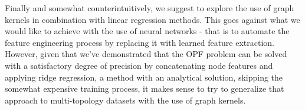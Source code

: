 Finally and somewhat counterintuitively, we suggest to explore the use of graph kernels in combination with linear regression methods.
This goes against what we would like to achieve with the use of neural networks - that is to automate the feature engineering process
by replacing it with learned feature extraction.
However, given that we've demonstrated that the OPF problem can be solved with a satisfactory degree of precision by concatenating
node features and applying ridge regression, a method with an analytical solution, skipping the somewhat expensive training process,
it makes sense to try to generalize that approach to multi-topology datasets with the use of graph kernels.
